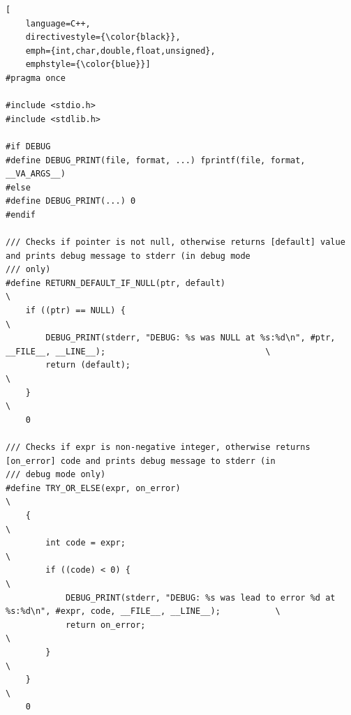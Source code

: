 \begin{lstlisting}[
    language=C++,
    directivestyle={\color{black}}, 
    emph={int,char,double,float,unsigned}, 
    emphstyle={\color{blue}}]
#pragma once

#include <stdio.h>
#include <stdlib.h>

#if DEBUG
#define DEBUG_PRINT(file, format, ...) fprintf(file, format, __VA_ARGS__)
#else
#define DEBUG_PRINT(...) 0
#endif

/// Checks if pointer is not null, otherwise returns [default] value and prints debug message to stderr (in debug mode
/// only)
#define RETURN_DEFAULT_IF_NULL(ptr, default)                                                                           \
    if ((ptr) == NULL) {                                                                                               \
        DEBUG_PRINT(stderr, "DEBUG: %s was NULL at %s:%d\n", #ptr, __FILE__, __LINE__);                                \
        return (default);                                                                                              \
    }                                                                                                                  \
    0

/// Checks if expr is non-negative integer, otherwise returns [on_error] code and prints debug message to stderr (in
/// debug mode only)
#define TRY_OR_ELSE(expr, on_error)                                                                                    \
    {                                                                                                                  \
        int code = expr;                                                                                               \
        if ((code) < 0) {                                                                                              \
            DEBUG_PRINT(stderr, "DEBUG: %s was lead to error %d at %s:%d\n", #expr, code, __FILE__, __LINE__);           \
            return on_error;                                                                                           \
        }                                                                                                              \
    }                                                                                                                  \
    0


\end{lstlisting}
